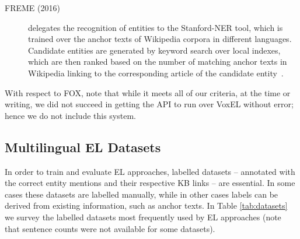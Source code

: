 \documentclass{llncs}
\begin{document}
\begin{description}
\item[FREME (2016)] delegates the recognition of entities to the Stanford-NER tool, which is trained over the anchor texts of Wikipedia corpora in different languages. Candidate entities are generated by keyword search over local indexes, which are then ranked based on the number of matching anchor texts in Wikipedia linking to the corresponding article of the candidate entity~\cite{freme-ner2016}.
\end{description}

With respect to FOX, note that while it meets all of our criteria, at the time or writing, we did not succeed in getting the API to run over VoxEL without error; hence we do not include this system.




\subsection{Multilingual EL Datasets}

In order to train and evaluate EL approaches, labelled datasets -- annotated with the correct entity mentions and their respective KB links -- are essential. In some cases these datasets are labelled manually, while in other cases labels can be derived from existing information, such as anchor texts. In Table \ref{tab:datasets} we survey the labelled datasets most frequently used by EL approaches (note that sentence counts were not available for some datasets).
\end{document}
